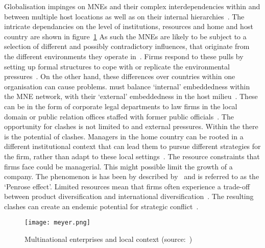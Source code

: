Globalisation impinges on MNEs and their complex interdependencies within and between multiple host locations as well as on their internal hierarchies~\citep{Meyer:2011vt}.
The intricate dependancies on the level of institutions, resources and home and host country are shown in figure~\ref{fig:Meyer}
As such the MNEs are likely to be subject to a selection of different and possibly contradictory influences, that originate from the different environments they operate in~\citep{Westney:2005vv}.
Firms respond to these \iso pulls by setting up formal structures to cope with or replicate the environmental pressures~\citep{Westney:2005vv}. 
On the other hand, these differences over countries within one organisation can cause problems.
\mne must balance ‘internal’ embeddedness within the MNE network, with their ‘external’ embeddedness in the host milieu~\citep{Meyer:2011vt}.
These can be in the form of corporate legal departments \iso to law firms in the local domain or public relation offices staffed with former public officials~\citep{Westney:2005vv}. 
The opportunity for clashes is not limited to \mne and external pressures.
Within the \mne there is the potential of clashes. 
Managers in the home country can be rooted in a different institutional context that can lead them to pursue different strategies for the firm, rather than adapt to these local settings~\citep{Jackson:2008cz}.
The resource constraints that firms face could be managerial.
This might possible limit the growth of a company.
The phenomenon is has been by described by~\citep{Hutzschenreuter:2011bv} and is referred to as the ‘Penrose effect’. 
Limited resources mean that firms often experience a trade-off between product diversification and international diversification~\citep{Dunning:2008}.
The resulting clashes can create an endemic potential for strategic conflict~\citep{Jackson:2008cz}.

\begin{figure}[htbp] 
	\centering
	\texttt{[image: meyer.png]}
 	\caption[Multinational enterprises and local context]{Multinational enterprises and local context (source:~\cite{Meyer:2011vt})}\label{fig:Meyer}
\end{figure}

